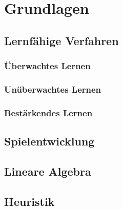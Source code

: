 \chapter{Grundlagen}
\label{cha:grundlagen}


\section{Lernfähige Verfahren}

\subsection{Überwachtes Lernen}

\subsection{Unüberwachtes Lernen}

\subsection{Bestärkendes Lernen}

\section{Spielentwicklung}

\section{Lineare Algebra}

\section{Heuristik}